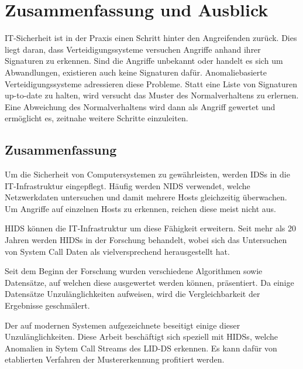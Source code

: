\chapter{Zusammenfassung und Ausblick}\label{ch:schluss}

IT-Sicherheit ist in der Praxis einen Schritt hinter den Angreifenden zurück.
Dies liegt daran, dass Verteidigungssysteme versuchen Angriffe anhand ihrer Signaturen zu erkennen.
Sind die Angriffe unbekannt oder handelt es sich um Abwandlungen, existieren auch keine Signaturen dafür.
Anomaliebasierte Verteidigungssysteme adressieren diese Probleme.
Statt eine Liste von Signaturen up-to-date zu halten, wird versucht das Muster des Normalverhaltens zu erlernen.
Eine Abweichung des Normalverhaltens wird dann als Angriff gewertet und ermöglicht es, zeitnahe weitere Schritte einzuleiten.

\section{Zusammenfassung}

Um die Sicherheit von Computersystemen zu gewährleisten, werden \acfp{IDS} in die IT-Infrastruktur eingepflegt.
Häufig werden \acf{NIDS} verwendet, welche Netzwerkdaten untersuchen und damit mehrere Hosts gleichzeitig überwachen.
Um Angriffe auf einzelnen Hosts zu erkennen, reichen diese meist nicht aus.\par\medskip

\acf{HIDS} können die IT-Infra\-struktur um diese Fähigkeit erweitern.
Seit mehr als 20 Jahren werden \acp{HIDS} in der Forschung behandelt, wobei sich das Untersuchen von System Call Daten als vielversprechend herausgestellt hat.\par\medskip

Seit dem Beginn der Forschung wurden verschiedene Algorithmen sowie Datensätze, auf welchen diese ausgewertet werden können, präsentiert.
Da einige Datensätze Unzulänglichkeiten aufweisen, wird die Vergleichbarkeit der Ergebnisse geschmälert.\par\medskip

Der auf modernen Systemen aufgezeichnete  beseitigt einige dieser Unzulänglichkeiten.
Diese Arbeit beschäftigt sich speziell mit \acp{HIDS}, welche Anomalien in Sytem Call Streams des \ac{LID-DS} erkennen. Es kann dafür von etablierten Verfahren der Mustererkennung profitiert werden.\par\medskip

